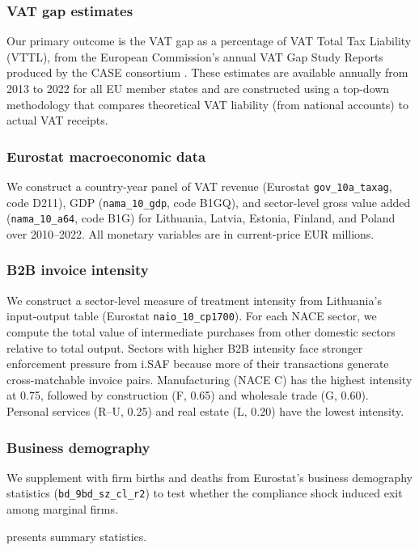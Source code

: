 \documentclass[12pt]{article}
\begin{document}
\subsubsection*{VAT gap estimates} Our primary outcome is the VAT gap as a percentage of VAT Total Tax Liability (VTTL), from the European Commission's annual VAT Gap Study Reports produced by the CASE consortium \citep{EC2023vatgap}. These estimates are available annually from 2013 to 2022 for all EU member states and are constructed using a top-down methodology that compares theoretical VAT liability (from national accounts) to actual VAT receipts.

\subsubsection*{Eurostat macroeconomic data} We construct a country-year panel of VAT revenue (Eurostat \texttt{gov\_10a\_taxag}, code D211), GDP (\texttt{nama\_10\_gdp}, code B1GQ), and sector-level gross value added (\texttt{nama\_10\_a64}, code B1G) for Lithuania, Latvia, Estonia, Finland, and Poland over 2010--2022. All monetary variables are in current-price EUR millions.

\subsubsection*{B2B invoice intensity} We construct a sector-level measure of treatment intensity from Lithuania's input-output table (Eurostat \texttt{naio\_10\_cp1700}). For each NACE sector, we compute the total value of intermediate purchases from other domestic sectors relative to total output. Sectors with higher B2B intensity face stronger enforcement pressure from i.SAF because more of their transactions generate cross-matchable invoice pairs. Manufacturing (NACE C) has the highest intensity at 0.75, followed by construction (F, 0.65) and wholesale trade (G, 0.60). Personal services (R--U, 0.25) and real estate (L, 0.20) have the lowest intensity.

\subsubsection*{Business demography} We supplement with firm births and deaths from Eurostat's business demography statistics (\texttt{bd\_9bd\_sz\_cl\_r2}) to test whether the compliance shock induced exit among marginal firms.

 presents summary statistics.
\end{document}
